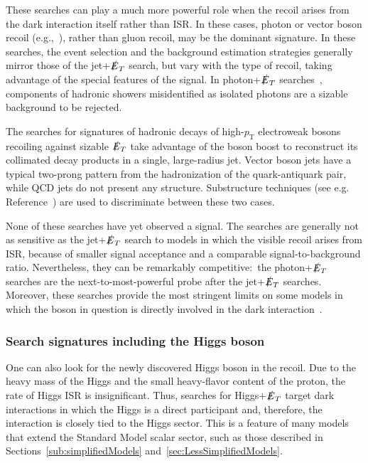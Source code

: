 \documentclass{ar-1col}
\newcommand{\pT}{\ensuremath{p_\mathrm{T}}\xspace}
\newcommand{\MET}{\ensuremath{\slashed{E}_T}\xspace}
\begin{document}
These searches can play a much more powerful role when the recoil
arises from the dark interaction itself rather than ISR. In these
cases, photon or vector boson recoil
(e.g.,~), rather than gluon
recoil, may be the dominant signature. In these searches, the
event selection and the background estimation strategies generally
mirror those of the jet+\MET search, but vary with the type of
recoil, taking advantage of the special features of the signal. In
photon+\MET searches~\cite{Aaboud:2017dor,CMS-PAS-EXO-16-014},
components of hadronic showers misidentified as isolated photons
are a sizable background to be rejected. 

The searches for signatures of hadronic decays
of high-\pT{} electroweak bosons recoiling against sizable \MET
take advantage of the boson boost to reconstruct its collimated decay products
in a single, large-radius jet. 
Vector boson jets have a typical two-prong pattern from the hadronization
of the quark-antiquark pair, while QCD jets do not present any structure.
Substructure techniques (see e.g. Reference~\cite{Larkoski:2017jix}) are
used to discriminate between these two cases. 

None of these searches have yet observed a signal. The searches are generally not
as sensitive as the jet+\MET search to models in which the
visible recoil arises from ISR, because of smaller signal
acceptance and a comparable signal-to-background ratio. Nevertheless, they can
be remarkably competitive:\ the
photon+\MET searches are the next-to-most-powerful probe after the jet+\MET searches. Moreover,
these searches provide the most stringent limits on some models
in which the boson in question is directly involved in the dark
interaction~\cite{Berlin:2014cfa}.

\subsubsection{Search signatures including the Higgs boson}

One can also look for the newly discovered Higgs boson in the
recoil. Due to the heavy mass of the Higgs and the small
heavy-flavor content of the proton, the rate of Higgs ISR is
insignificant. Thus, searches for Higgs+\MET target dark
interactions in which the Higgs is a direct participant and,
therefore, the interaction is closely tied to the Higgs sector.
This is a feature of many models that extend the Standard Model scalar sector, 
such as those described in Sections~\ref{sub:simplifiedModels} and~\ref{sec:LessSimplifiedModels}. 
\end{document}
